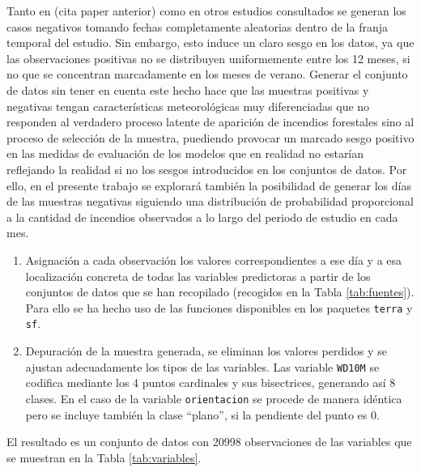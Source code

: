 \documentclass[12pt,a4paper,]{book}
\numberwithin{dummy}{section}
\theoremstyle{ocrenumbox}
\theoremstyle{blacknumex}
\theoremstyle{blacknumbox}
\theoremstyle{ocrenum}
\theoremstyle{ocrenum}
\begin{document}
Tanto en (cita paper anterior) como en otros estudios consultados se
generan los casos negativos tomando fechas completamente aleatorias
dentro de la franja temporal del estudio. Sin embargo, esto induce un
claro sesgo en los datos, ya que las observaciones positivas no se
distribuyen uniformemente entre los 12 meses, si no que se concentran
marcadamente en los meses de verano. Generar el conjunto de datos sin
tener en cuenta este hecho hace que las muestras positivas y negativas
tengan características meteorológicas muy diferenciadas que no responden
al verdadero proceso latente de aparición de incendios forestales sino
al proceso de selección de la muestra, puediendo provocar un marcado
sesgo positivo en las medidas de evaluación de los modelos que en
realidad no estarían reflejando la realidad si no los sesgos
introducidos en los conjuntos de datos. Por ello, en el presente trabajo
se explorará también la posibilidad de generar los días de las muestras
negativas siguiendo una distribución de probabilidad proporcional a la
cantidad de incendios observados a lo largo del periodo de estudio en
cada mes.

\begin{enumerate}
\def\labelenumi{\arabic{enumi}.}
\setcounter{enumi}{1}
\item
  Asignación a cada observación los valores correspondientes a ese día y
  a esa localización concreta de todas las variables predictoras a
  partir de los conjuntos de datos que se han recopilado (recogidos en
  la Tabla \ref{tab:fuentes}). Para ello se ha hecho uso de las
  funciones disponibles en los paquetes \texttt{terra} y \texttt{sf}.
\item
  Depuración de la muestra generada, se eliminan los valores perdidos y
  se ajustan adecuadamente los tipos de las variables. Las variable
  \texttt{WD10M} se codifica mediante los 4 puntos cardinales y sus
  bisectrices, generando así 8 clases. En el caso de la variable
  \texttt{orientacion} se procede de manera idéntica pero se incluye
  también la clase ``plano'', si la pendiente del punto es 0.
\end{enumerate}

El resultado es un conjunto de datos con 20998 observaciones de las
variables que se muestran en la Tabla \ref{tab:variables}.
\end{document}
